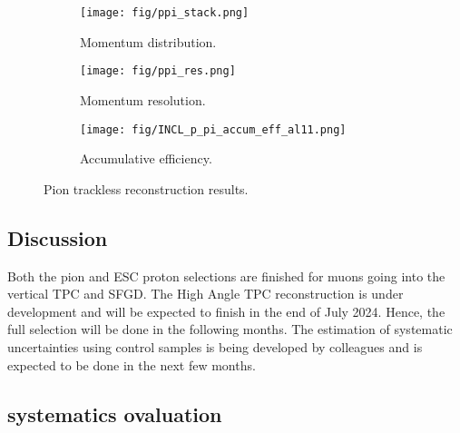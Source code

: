            \begin{figure}[t]
               \centering
               \begin{subfigure}{0.3\textwidth}
                    \texttt{[image: fig/ppi\_stack.png]}
                    \caption{Momentum distribution.}
                    \label{fig:ppi-stack}
               \end{subfigure}
               \begin{subfigure}{0.3\textwidth}
                    \texttt{[image: fig/ppi\_res.png]}
                    \caption{Momentum resolution.}
                    \label{fig:ppi-res}
               \end{subfigure}
               \begin{subfigure}{0.3\textwidth}
                    \texttt{[image: fig/INCL\_p\_pi\_accum\_eff\_al11.png]}
                    \caption{Accumulative efficiency.}
                    \label{fig:tl-accum-eff}
               \end{subfigure}
               \caption{Pion trackless reconstruction results.}
               \label{fig:piTLres}
            \end{figure}


            

    \subsection{Discussion}
        Both the pion and ESC proton selections are finished for muons going into the vertical TPC and SFGD. The High Angle TPC reconstruction is under development and will be expected to finish in the end of July 2024. Hence, the full selection will be done in the following months. The estimation of systematic uncertainties using control samples is being developed by colleagues and is expected to be done in the next few months. 


     \subsection{systematics ovaluation}
